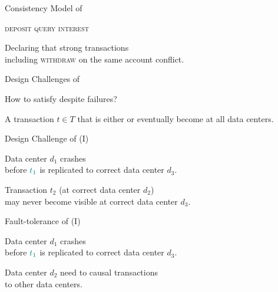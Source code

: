 \begin{frame}{Consistency Model of \unistore}
  \begin{center}
    \textsc{deposit \quad {} \quad query \quad interest}

    \vspace{0.50cm}
    Declaring that strong transactions \\[3pt]
    including \textsc{withdraw} on the same account conflict.
  \end{center}
\end{frame}

\begin{frame}{Design Challenges of \unistore}
  \begin{center}
    {How to satisfy  despite failures?}

    \vspace{0.50cm}
    A transaction $t \in T$ that is either 
    or 
    eventually become  at all  data centers.
  \end{center}
\end{frame}

\begin{frame}{Design Challenge of \unistore{} (I)}
  \begin{center}
    {Data center $d_{1}$ crashes \\[3pt]
      before $\textcolor{teal}{t_{1}}$ is replicated to correct data center $d_{3}$.}

    \vspace{0.20cm}

    \pause
    Transaction $t_{2}$ (at correct data center $d_{2}$) \\[3pt]
    may never become visible at correct data center $d_{3}$.
  \end{center}
\end{frame}

\begin{frame}{Fault-tolerance of \unistore{} (I)}
  \begin{center}
    Data center $d_{1}$ crashes \\[3pt]
    before $\textcolor{teal}{t_{1}}$ is replicated to correct data center $d_{3}$.

    \vspace{0.20cm}

    \pause
    Data center $d_{2}$ need to  causal transactions \\[3pt]
    to other data centers.
  \end{center}
\end{frame}

